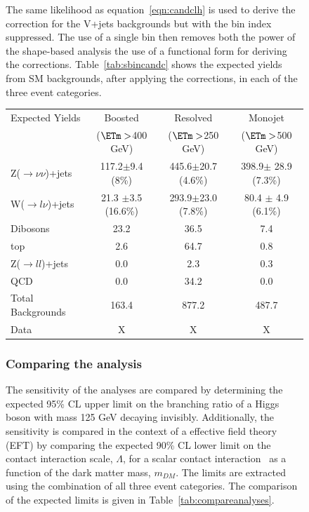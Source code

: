 \begin{figure}[hbtp]
The same likelihood as equation~\ref{eqn:candclh} 
is used to derive the correction for the V+jets backgrounds but with the bin index suppressed. The use of a single 
bin then removes both the power of the shape-based analysis the use of a functional form for deriving the corrections.
Table~\ref{tab:sbincandc} shows the expected yields from SM backgrounds, after applying the corrections, in 
each of the three event categories.

\begin{table}[htbp]
  \begin{center}
    \begin{tabular}{lccc}
      \hline
      \hline
      Expected Yields 		    & Boosted & Resolved & Monojet \\
      		 		    &($\ETm>$400 GeV) &($\ETm>$250 GeV) &($\ETm>$500 GeV) \\
      \hline
      \hline
      Z($\rightarrow \nu\nu$)+jets  & 117.2$\pm$9.4 (8\%)     & 445.6$\pm$20.7 (4.6\%) & 398.9$\pm$ 28.9 (7.3\%)  \\
      W($\rightarrow l\nu$)+jets    & 21.3 $\pm$3.5 (16.6\%)  & 293.9$\pm$23.0 (7.8\%) & 80.4 $\pm$ 4.9 (6.1\%) \\                
      Dibosons  		    & 23.2  & 36.5  & 7.4  \\           
      top  			    & 2.6   & 64.7  & 0.8  \\               
      Z($\rightarrow ll$)+jets      & 0.0   & 2.3   & 0.3  \\ 
      QCD		            & 0.0   & 34.2  & 0.0  \\ 
      \hline
      Total Backgrounds		    & 163.4 & 877.2 & 487.7  \\
      Data                          & X & X & X \\
      \hline
      \hline
    \end{tabular}
  \end{center}
\end{table}


\subsubsection{Comparing the analysis}
The sensitivity of the analyses are compared by determining the expected 95\% CL upper limit on the branching ratio
of a Higgs boson with mass 125 GeV decaying invisibly. Additionally, the sensitivity is compared in the context of 
a effective field theory (EFT) by comparing the expected 90\% CL lower limit on the contact interaction scale, $\Lambda$, 
for a scalar contact interaction~\cite{Beltran:2010ww,Goodman:2010ku} as a function of the dark matter mass, $m_{DM}$. 
The limits are extracted using the combination of all three event categories. The comparison of the expected limits is 
given in Table~\ref{tab:compareanalyses}. 
 

\end{figure}
